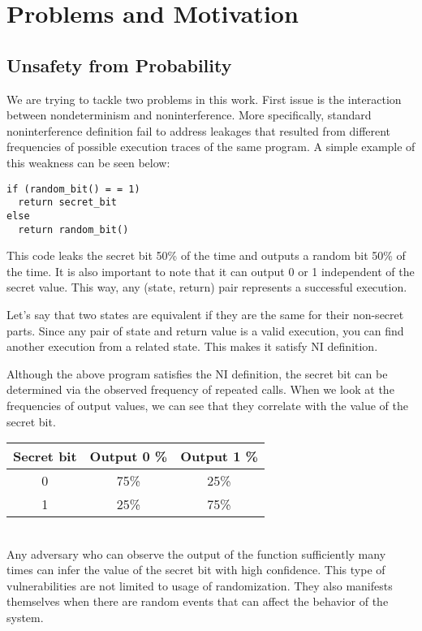 
\section{Problems and Motivation}
\subsection{Unsafety from Probability}
We are trying to tackle two problems in this work. First issue is the interaction between nondeterminism and noninterference. More specifically, standard noninterference definition fail to address leakages that resulted from different frequencies of possible execution traces of the same program. A simple example of this weakness can be seen below: 

\begin{lstlisting}
if (random_bit() = = 1)
  return secret_bit
else
  return random_bit()
\end{lstlisting}

This code leaks the secret bit 50\% of the time and outputs a random bit 50\% of the time. It is also important to note that it can output 0 or 1 independent of the secret value. This way, any (state, return) pair represents a successful execution. 

Let's say that two states are equivalent if they are the same for their non-secret parts. Since any pair of state and return value is a valid execution, you can find another execution from a related state. This makes it satisfy NI definition.

Although the above program satisfies the NI definition, the secret bit can be determined via the observed frequency of repeated calls. When we look at the frequencies of output values, we can see that they correlate with the value of the secret bit.\\

\begin{tabular}{| c | c | c |}
	\hline
	Secret bit & Output 0 \% & Output 1 \% \\
	\hline
	0 &	75\% & 25\% \\
	\hline
	1 &	25\% & 75\% \\
	\hline
\end{tabular}\\

Any adversary who can observe the output of the function sufficiently many times can infer the value of the secret bit with high confidence. This type of vulnerabilities are not limited to usage of randomization. They also manifests themselves when there are random events that can affect the behavior of the system. 

